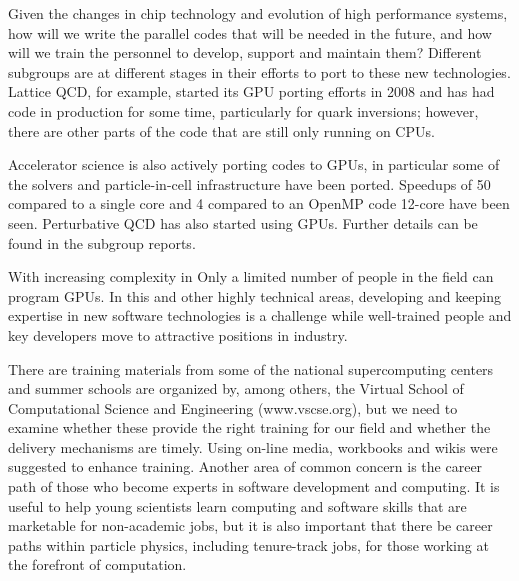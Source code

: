 Given the changes in chip technology and evolution of high performance systems, how will we write the parallel codes that will be needed in the future, and how will we train the personnel to develop, support and maintain them? Different subgroups are at different stages in their efforts to port to these new technologies.  Lattice QCD, for example, started its GPU porting efforts in 2008 and has had code in production for some time, particularly for quark inversions; however, there are other parts of the code that are still only running on CPUs.  

Accelerator science is also actively porting codes to GPUs, in particular some of the solvers and particle-in-cell infrastructure have been ported.  Speedups of 50 compared to a single core and 4 compared to an OpenMP code 12-core have been seen. Perturbative QCD has also started using GPUs. Further details can be found in the subgroup reports.

With increasing complexity in Only a limited number of people in the field can program GPUs. In this and other highly technical areas, developing and keeping expertise in new software technologies is a challenge while well-trained people and key developers move to attractive positions in industry. 

There are training materials from some of the national supercomputing centers and summer schools are organized by, among others, the Virtual School of Computational Science and Engineering (www.vscse.org), but we need to examine whether these provide the right training for our field and whether the delivery mechanisms are timely.  Using on-line media, workbooks and wikis were suggested to enhance training.  Another area of common concern is the career path of those who become experts in software development and computing.  It is useful to help young scientists learn computing and software skills that are marketable for non-academic jobs, but it is also important that there be career paths within particle physics, including tenure-track jobs, for those working at the forefront of computation.

